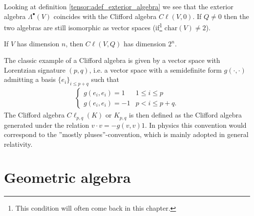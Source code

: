     \begin{remark}
        Looking at definition \ref{tensor:adef_exterior_algebra} we see that the exterior algebra $\Lambda^\bullet(V)$ coincides with the Clifford algebra $C\ell(V, 0)$. If $Q\neq0$ then the two algebras are still isomorphic as vector spaces (if\footnote{This condition will often come back in this chapter.} $\text{char}(V)\neq2$).
    \end{remark}

    \begin{property}[Dimension]
        If $V$ has dimension $n$, then $C\ell(V, Q)$ has dimension $2^n$.
    \end{property}

    \begin{example}
        The classic example of a Clifford algebra is given by a vector space with Lorentzian signature $(p, q)$, i.e. a vector space with a semidefinite form $g(\cdot, \cdot)$ admitting a basis $\{e_i\}_{i\leq p+q}$ such that
        \begin{gather}
            \begin{cases}
                g(e_i, e_i) = 1 & 1\leq i\leq p\\
                g(e_i, e_i) = -1 & p<i\leq p+q.
            \end{cases}
        \end{gather}
        The Clifford algebra $C\ell_{p,q}(K)$ or $K_{p, q}$ is then defined as the Clifford algebra generated under the relation $v\cdot v = -g(v, v)1$. In physics this convention would correspond to the ''mostly pluses''-convention, which is mainly adopted in general relativity.
    \end{example}

\section{Geometric algebra}


